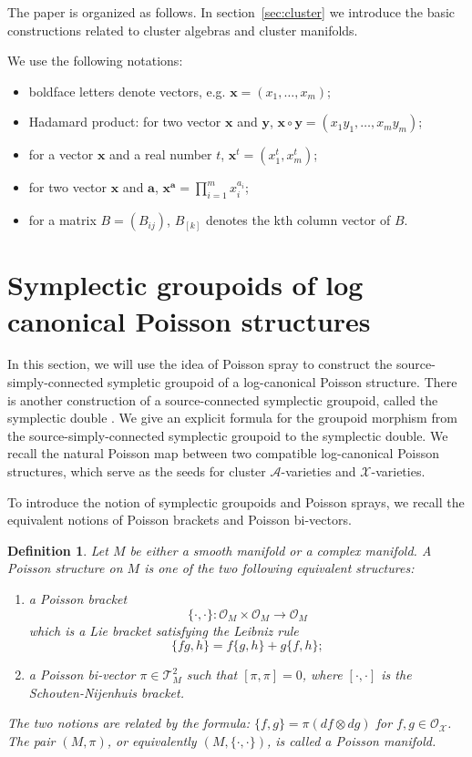 \documentclass{amsart}
\newtheorem{definition}[theorem]{Definition}
\numberwithin{equation}{section}
\newcommand{\bfa}{\mathbf{a}}
\newcommand{\bfx}{\mathbf{x}}
\newcommand{\bfy}{\mathbf{y}}
\newcommand{\cA}{\mathcal{A}}
\newcommand{\cO}{\mathcal{O}}
\newcommand{\cX}{\mathcal{X}}
\newcommand{\cT}{\mathcal{T}}
\begin{document}
The paper is organized as follows.
In section~\ref{sec:cluster} we introduce the basic constructions related to cluster algebras and cluster manifolds.

We use the following notations:
\begin{itemize}
	\item boldface letters denote vectors, e.g. $\bfx = (x_1, \ldots, x_m)$;
	\item Hadamard product: for two vector $\bfx$ and $\bfy$, $\bfx \circ \bfy = (x_1y_1, \ldots, x_my_m)$;
	\item for a vector $\bfx$ and a real number $t$, $\bfx^t = (x_1^t, x_m^t)$;
	\item for two vector $\bfx$ and $\bfa$, $\bfx^\bfa = \prod_{i=1}^m x_i^{a_i}$;
	\item for a matrix $B = (B_{ij})$, $B_{[k]}$ denotes the kth column vector of $B$.
\end{itemize}


\section{Symplectic groupoids of log canonical Poisson structures}

In this section, we will use the idea of Poisson spray \cite{MR2900786} to construct the source-simply-connected sympletic groupoid of a log-canonical Poisson structure.
There is another construction of a source-connected symplectic groupoid, called the symplectic double \cite{MR2470108}.
We give an explicit formula for the groupoid morphism from the source-simply-connected symplectic groupoid to the symplectic double.
We recall the natural Poisson map between two compatible log-canonical Poisson structures, which serve as the seeds for cluster $\cA$-varieties and $\cX$-varieties.

To introduce the notion of symplectic groupoids and Poisson sprays, we recall the equivalent notions of Poisson brackets and Poisson bi-vectors.
\begin{definition}
  Let $M$ be either a smooth manifold or a complex manifold.
  A \emph{Poisson structure} on $M$ is one of the two following equivalent structures:
  \begin{enumerate}
    \item a \emph{Poisson bracket}
      $$\{\cdot, \cdot\}: \cO_M \times \cO_M \to \cO_M$$
      which is a Lie bracket satisfying the Leibniz rule
      $$\{fg, h\} = f\{g,h\} + g\{f,h\};$$
    \item a \emph{Poisson bi-vector} $\pi \in \cT^2_M$ such that $[\pi, \pi] = 0$, where $[\cdot, \cdot]$ is the Schouten-Nijenhuis bracket.
  \end{enumerate}	
  The two notions are related by the formula: $\{f, g\} = \pi (df \otimes dg)$ for $f, g\in \cO_\cX$.
  The pair $(M, \pi)$, or equivalently $(M, \{\cdot,\cdot\})$, is called a \emph{Poisson manifold}.
\end{definition}
\end{document}
